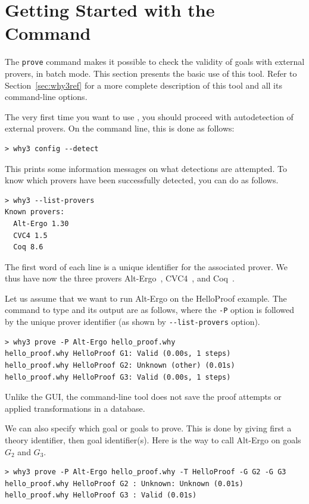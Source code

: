\section{Getting Started with the \why Command}
\label{sec:batch}

The \texttt{prove} command makes it possible to check the validity of goals with external
provers, in batch mode. This section presents the basic use of this
tool. Refer to Section~\ref{sec:why3ref} for a more complete
description of this tool and all its command-line options.

The very first time you want to use \why, you should proceed with
autodetection of external provers.
On the command line, this is done as follows:
\begin{verbatim}
> why3 config --detect
\end{verbatim}
This prints some information messages on what detections are attempted. To know which
provers have been successfully detected, you can do as follows.
\begin{verbatim}
> why3 --list-provers
Known provers:
  Alt-Ergo 1.30
  CVC4 1.5
  Coq 8.6
\end{verbatim}
The first word of each line
is a unique identifier for the associated prover. We thus have now the
three provers Alt-Ergo~\cite{ergo}, CVC4~\cite{cvc4}, and
Coq~\cite{CoqArt}.

Let us assume that we want to run Alt-Ergo on the HelloProof
example. The command to type and its output are as follows, where the
\verb|-P| option is followed by the unique prover identifier (as shown
by \verb|--list-provers| option).
\begin{verbatim}
> why3 prove -P Alt-Ergo hello_proof.why
hello_proof.why HelloProof G1: Valid (0.00s, 1 steps)
hello_proof.why HelloProof G2: Unknown (other) (0.01s)
hello_proof.why HelloProof G3: Valid (0.00s, 1 steps)
\end{verbatim}
Unlike the \why GUI, the command-line tool does not save the proof attempts
or applied transformations in a database.

We can also specify which goal or goals to prove. This is done by giving
first a theory identifier, then goal identifier(s). Here is the way to
call Alt-Ergo on goals $G_2$ and $G_3$.
\begin{verbatim}
> why3 prove -P Alt-Ergo hello_proof.why -T HelloProof -G G2 -G G3
hello_proof.why HelloProof G2 : Unknown: Unknown (0.01s)
hello_proof.why HelloProof G3 : Valid (0.01s)
\end{verbatim}

